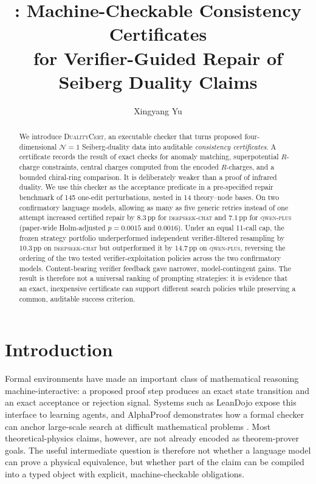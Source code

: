\documentclass[11pt]{scrartcl}
\title{\toolname: Machine-Checkable Consistency Certificates\\
for Verifier-Guided Repair of Seiberg Duality Claims}
\author[1]{Xingyang Yu}
\affil[1]{Department of Physics, Virginia Tech, Blacksburg, Virginia 24061, USA}
\date{}
\newcommand{\toolname}{\textsc{DualityCert}}
\newcommand{\dscode}{\textsc{deepseek-chat}}
\newcommand{\qwcode}{\textsc{qwen-plus}}
\newcommand{\pp}{\,\mathrm{pp}}
\begin{document}
\maketitle

\begin{abstract}
We introduce \toolname, an executable checker that turns proposed
four-dimensional $\mathcal N=1$ Seiberg-duality data into auditable
\emph{consistency certificates}.  A certificate records the result of exact
checks for anomaly matching, superpotential $R$-charge constraints, central
charges computed from the encoded $R$-charges, and a bounded chiral-ring
comparison.  It is deliberately weaker than a proof of infrared duality.  We
use this checker as the acceptance predicate in a pre-specified repair
benchmark of 145 one-edit perturbations, nested in 14 theory--node bases.  On
two confirmatory language models, allowing as many as five generic retries
instead of one attempt increased certified repair by $8.3\pp$ for \dscode{} and
$7.1\pp$ for \qwcode{} (paper-wide Holm-adjusted $p=0.0015$ and $0.0016$).
Under an equal 11-call cap, the frozen strategy portfolio underperformed
independent verifier-filtered resampling by $10.3\pp$ on \dscode{} but
outperformed it by $14.7\pp$ on \qwcode{}, reversing the ordering of the two
tested verifier-exploitation policies across the two confirmatory models.
Content-bearing verifier feedback gave narrower, model-contingent gains.  The
result is therefore not a universal ranking of prompting strategies: it is
evidence that an exact, inexpensive certificate can support different search
policies while preserving a common, auditable success criterion.
\end{abstract}

\section{Introduction}
\label{sec:intro}

Formal environments have made an important class of mathematical reasoning
machine-interactive: a proposed proof step produces an exact state transition
and an exact acceptance or rejection signal.  Systems such as LeanDojo expose
this interface to learning agents, and AlphaProof demonstrates how a formal
checker can anchor large-scale search at difficult mathematical problems
\cite{Yang:2023leandojo,Hubert:2026alphaproof}.  Most theoretical-physics
claims, however, are not already encoded as theorem-prover goals.  The useful
intermediate question is therefore not whether a language model can prove a
physical equivalence, but whether part of the claim can be compiled into a
typed object with explicit, machine-checkable obligations.
\end{document}
